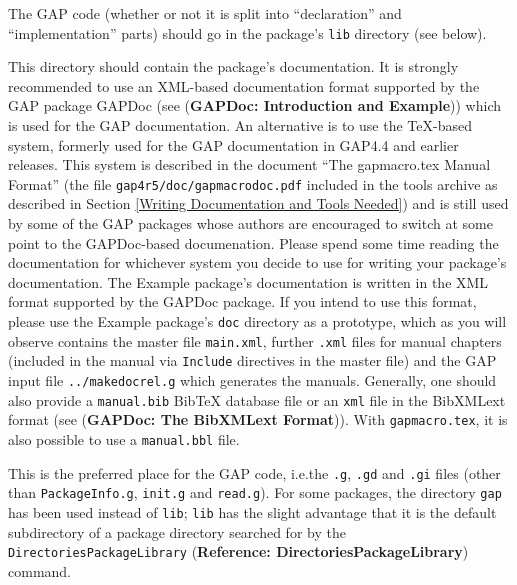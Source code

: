 \documentclass[a4paper,11pt]{report}
\begin{document}
{{\begin{description}
 The \textsf{GAP} code (whether or not it is split into ``declaration'' and ``implementation'' parts) should go in the package's \texttt{lib} directory (see below). 
\item[{\texttt{doc}}]    This directory should contain the package's documentation. It is strongly
recommended to use an XML-based documentation format supported by the \textsf{GAP} package \textsf{GAPDoc} (see  (\textbf{GAPDoc: Introduction and Example})) which is used for the \textsf{GAP} documentation. An alternative is to use the {\TeX}-based system, formerly used for the \textsf{GAP} documentation in \textsf{GAP}{\nobreakspace}4.4 and earlier releases. This system is described in the
document ``The gapmacro.tex Manual Format'' (the file \texttt{gap4r5/doc/gapmacrodoc.pdf} included in the tools archive as described in Section \ref{Writing Documentation and Tools Needed}) and is still used by some of the \textsf{GAP} packages whose authors are encouraged to switch at some point to the \textsf{GAPDoc}-based documenation. Please spend some time reading the documentation for
whichever system you decide to use for writing your package's documentation.
The \textsf{Example} package's documentation is written in the XML format supported by the \textsf{GAPDoc} package. If you intend to use this format, please use the \textsf{Example} package's \texttt{doc} directory as a prototype, which as you will observe contains the master file \texttt{main.xml}, further \texttt{.xml} files for manual chapters (included in the manual via \texttt{Include} directives in the master file) and the \textsf{GAP} input file \texttt{../makedocrel.g} which generates the manuals. Generally, one should also provide a \texttt{manual.bib} Bib{\TeX} database file or an \texttt{xml} file in the BibXMLext format (see  (\textbf{GAPDoc: The BibXMLext Format})). With \texttt{gapmacro.tex}, it is also possible to use a \texttt{manual.bbl} file.  
\item[{\texttt{lib}}]  This is the preferred place for the \textsf{GAP} code, i.e.{\nobreakspace}the \texttt{.g}, \texttt{.gd} and \texttt{.gi} files (other than \texttt{PackageInfo.g}, \texttt{init.g} and \texttt{read.g}). For some packages, the directory \texttt{gap} has been used instead of \texttt{lib}; \texttt{lib} has the slight advantage that it is the default subdirectory of a package
directory searched for by the \texttt{DirectoriesPackageLibrary} (\textbf{Reference: DirectoriesPackageLibrary}) command. 

\end{description}}}
\end{document}
